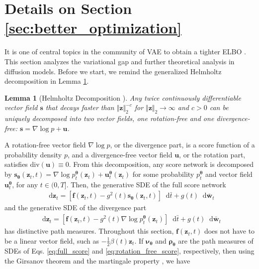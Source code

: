 \documentclass{article}
\newtheorem{lemma}{Lemma}
\theoremstyle{definition}
\theoremstyle{remark}
\newcommand*\diff{\mathop{}\!\mathrm{d}}
\begin{document}
	
	\section{Details on Section \ref{sec:better_optimization}}\label{appendix:variational_gap}
	It is one of central topics in the community of VAE to obtain a tighter ELBO \cite{rezende2015variational,burda2015importance}. This section analyzes the variational gap and further theoretical analysis in diffusion models. Before we start, we remind the generalized Helmholtz decomposition in Lemma \ref{lemma:1}.
	\begin{lemma}[Helmholtz Decomposition \cite{glotzl2020helmholtz}]\label{lemma:1}
		Any twice continuously differentiable vector field $\mathbf{s}$ that decays faster than $\Vert\mathbf{z}\Vert_{2}^{-c}$ for $\Vert\mathbf{z}\Vert_{2}\rightarrow\infty$ and $c>0$ can be uniquely decomposed into two vector fields, one rotation-free and one divergence-free: $\mathbf{s}=\nabla\log{p}+\mathbf{u}$.
	\end{lemma}
	A rotation-free vector field $\nabla\log{p}$, or the divergence part, is a score function of a probability density $p$, and a divergence-free vector field $\mathbf{u}$, or the rotation part, satisfies $\text{div}(\mathbf{u})\equiv 0$. From this decomposition, any score network is decomposed by $\mathbf{s}_{\bm{\theta}}(\mathbf{z}_{t},t)=\nabla\log{p_{t}^{\bm{\theta}}(\mathbf{z}_{t})}+\mathbf{u}_{t}^{\bm{\theta}}(\mathbf{z}_{t})$ for some probability $p_{t}^{\bm{\theta}}$ and vector field $\mathbf{u}_{t}^{\bm{\theta}}$, for any $t\in(0,T]$. Then, the generative SDE of the full score network
	\begin{align}\label{eq:full_score}
	\diff\mathbf{z}_{t}=\left[\mathbf{f}(\mathbf{z}_{t},t)-g^{2}(t)\mathbf{s}_{\bm{\theta}}(\mathbf{z}_{t},t)\right]\diff\bar{t}+g(t)\diff\mathbf{\bar{w}}_{t}
	\end{align}
	and the generative SDE of the divergence part
	\begin{align}\label{eq:rotation_free_score}
	\diff\mathbf{z}_{t}=\left[\mathbf{f}(\mathbf{z}_{t},t)-g^{2}(t)\nabla\log{p_{t}^{\bm{\theta}}(\mathbf{z}_{t})}\right]\diff\bar{t}+g(t)\diff\mathbf{\bar{w}}_{t}
	\end{align}
	has distinctive path measures. Throughout this section, $\mathbf{f}(\mathbf{z}_{t},t)$ does not have to be a linear vector field, such as $-\frac{1}{2}\beta(t)\mathbf{z}_{t}$. If $\bm{\nu}_{\bm{\theta}}$ and $\bm{\rho}_{\bm{\theta}}$ are the path measures of SDEs of Eqs. \eqref{eq:full_score} and \eqref{eq:rotation_free_score}, respectively, then using the Girsanov theorem \cite{song2021maximum,sarkka2019applied} and the martingale property \cite{oksendal2013stochastic}, we have
\end{document}
